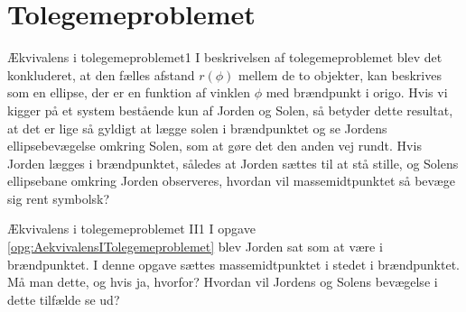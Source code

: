 \section*{Tolegemeproblemet}
%
%
\begin{opgave}{Ækvivalens i tolegemeproblemet}{1} \label{opg:AekvivalensITolegemeproblemet}
I beskrivelsen af tolegemeproblemet blev det konkluderet, at den fælles afstand $r(\phi)$ mellem de to objekter, kan beskrives som en ellipse, der er en funktion af vinklen $\phi$ med brændpunkt i origo. Hvis vi kigger på et system bestående kun af Jorden og Solen, så betyder dette resultat, at det er lige så gyldigt at lægge solen i brændpunktet og se Jordens ellipsebevægelse omkring Solen, som at gøre det den anden vej rundt. Hvis Jorden lægges i brændpunktet, således at Jorden sættes til at stå stille, og Solens ellipsebane omkring Jorden observeres, hvordan vil massemidtpunktet så bevæge sig rent symbolsk?
\end{opgave}
%
%
\begin{opgave}{Ækvivalens i tolegemeproblemet II}{1}
I opgave \ref{opg:AekvivalensITolegemeproblemet} blev Jorden sat som at være i brændpunktet. I denne opgave sættes massemidtpunktet i stedet i brændpunktet. Må man dette, og hvis ja, hvorfor? Hvordan vil Jordens og Solens bevægelse i dette tilfælde se ud?
\end{opgave}
%
%
%
